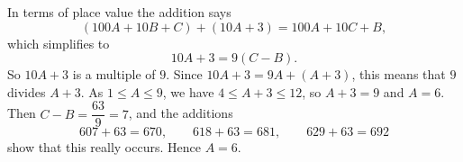 In terms of place value the addition says
\[(100A+10B+C)+(10A+3)=100A+10C+B,\]
which simplifies to
\[10A+3=9(C-B).\]
So $10A+3$ is a multiple of $9$. Since $10A+3=9A+(A+3)$, this means that $9$ divides $A+3$. As $1\le A\le9$, we have $4\le A+3\le12$, so $A+3=9$ and $A=6$. Then $C-B=\dfrac{63}{9}=7$, and the additions
\[607+63=670,\qquad 618+63=681,\qquad 629+63=692\]
show that this really occurs. Hence $A=\boxed{6}$.
